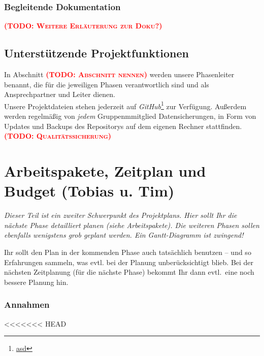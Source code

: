\documentclass[fontsize=12pt,paper=a4,twoside]{scrartcl}
\newcommand{\todo}[1]{\textbf{\textsc{\textcolor{red}{(TODO: #1)}}}}
\begin{document}
\subsubsection{Begleitende Dokumentation}
\todo{Weitere Erläuterung zur Doku?}
\subsection{Unterstützende Projektfunktionen}
In Abschnitt \todo{Abschnitt nennen} werden unsere Phasenleiter benannt, die für die jeweiligen Phasen verantwortlich sind und als Ansprechpartner und Leiter dienen.\\
Unsere Projektdateien stehen jederzeit auf \emph{GitHub}\footnote{\url{asd}} zur Verfügung. Außerdem werden regelmäßig von \emph{jedem} Gruppenmmitglied Datensicherungen, in Form von Updates und Backups des Repositorys auf dem eigenen Rechner stattfinden.\\


\todo{Qualitätssicherung}


\section{Arbeitspakete, Zeitplan und Budget (Tobias u. Tim)}

{\em Dieser Teil ist ein zweiter Schwerpunkt des Projektplans. Hier sollt Ihr die nächste Phase detailliert planen (siehe Arbeitspakete). Die weiteren Phasen sollen ebenfalls wenigstens grob geplant werden. Ein Gantt-Diagramm ist zwingend! 

Ihr sollt den Plan in der kommenden Phase auch tatsächlich benutzen -- und so
  Erfahrungen sammeln, was evtl. bei der Planung unberücksichtigt
  blieb. Bei der nächsten Zeitplanung (für die nächste Phase) bekommt
  Ihr dann evtl.\ eine noch bessere Planung hin.}
  
  
\subsubsection{Annahmen}\label{aps}
<<<<<<< HEAD
\end{document}
